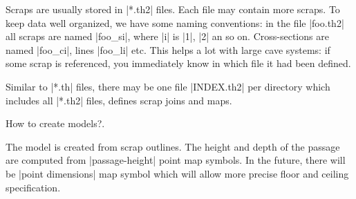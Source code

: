 Scraps are usually stored in |*.th2| files. Each file may contain more scraps. 
To keep data well organized, we have some naming conventions: in the file 
|foo.th2| all scraps are named |foo_si|, where |i| is |1|, |2| an so on. 
Cross-sections are named |foo_ci|, lines |foo_li| etc. This helps a lot with 
large cave systems: if some scrap is referenced, you immediately know in which 
file it had been defined.

Similar to |*.th| files, there may be one file |INDEX.th2| per directory which 
includes all |*.th2| files, defines scrap joins and maps.

\subsubchapter How to create models?.

The model is created from scrap outlines. The height and depth of the passage 
are computed from |passage-height| point map symbols. In the future, there will 
be |point dimensions| map symbol which will allow more precise floor and 
ceiling specification.


\endinput
